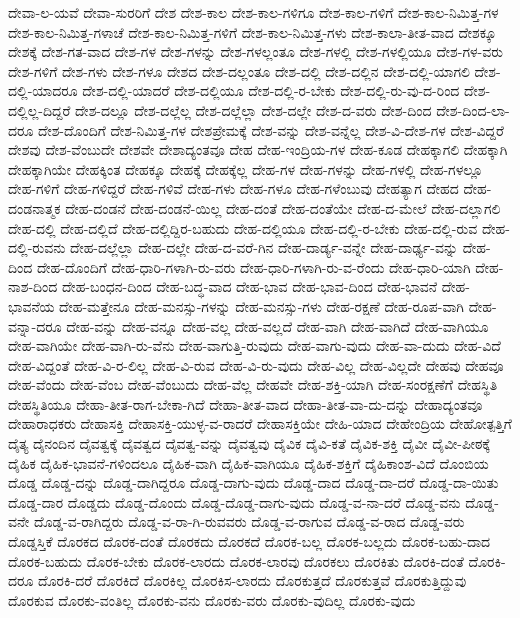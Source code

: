 {ದೇವಾ-ಲ-ಯವೆ
ದೇವಾ-ಸುರರಿಗೆ
ದೇಶ
ದೇಶ-ಕಾಲ
ದೇಶ-ಕಾಲ-ಗಳಿಗೂ
ದೇಶ-ಕಾಲ-ಗಳಿಗೆ
ದೇಶ-ಕಾಲ-ನಿಮಿತ್ತ-ಗಳ
ದೇಶ-ಕಾಲ-ನಿಮಿತ್ತ-ಗಳಾಚೆ
ದೇಶ-ಕಾಲ-ನಿಮಿತ್ತ-ಗಳಿಗೆ
ದೇಶ-ಕಾಲ-ನಿಮಿತ್ತ-ಗಳು
ದೇಶ-ಕಾಲಾ-ತೀತ-ವಾದ
ದೇಶಕ್ಕೂ
ದೇಶಕ್ಕೆ
ದೇಶ-ಗತ-ವಾದ
ದೇಶ-ಗಳ
ದೇಶ-ಗಳನ್ನು
ದೇಶ-ಗಳಲ್ಲಂತೂ
ದೇಶ-ಗಳಲ್ಲಿ
ದೇಶ-ಗಳಲ್ಲಿಯೂ
ದೇಶ-ಗಳ-ವರು
ದೇಶ-ಗಳಿಗೆ
ದೇಶ-ಗಳು
ದೇಶ-ಗಳೂ
ದೇಶದ
ದೇಶ-ದಲ್ಲಂತೂ
ದೇಶ-ದಲ್ಲಿ
ದೇಶ-ದಲ್ಲಿನ
ದೇಶ-ದಲ್ಲಿ-ಯಾಗಲಿ
ದೇಶ-ದಲ್ಲಿ-ಯಾದರೂ
ದೇಶ-ದಲ್ಲಿ-ಯಾದರೆ
ದೇಶ-ದಲ್ಲಿಯೂ
ದೇಶ-ದಲ್ಲಿ-ರ-ಬೇಕು
ದೇಶ-ದಲ್ಲಿ-ರು-ವು-ದ-ರಿಂದ
ದೇಶ-ದಲ್ಲಿಲ್ಲ-ದಿದ್ದರೆ
ದೇಶ-ದಲ್ಲೂ
ದೇಶ-ದಲ್ಲೆಲ್ಲ
ದೇಶ-ದಲ್ಲೆಲ್ಲಾ
ದೇಶ-ದಲ್ಲೇ
ದೇಶ-ದ-ವರು
ದೇಶ-ದಿಂದ
ದೇಶ-ದಿಂದ-ಲಾ-ದರೂ
ದೇಶ-ದೊಂದಿಗೆ
ದೇಶ-ನಿಮಿತ್ತ-ಗಳ
ದೇಶಪ್ರೇಮಕ್ಕೆ
ದೇಶ-ವನ್ನು
ದೇಶ-ವನ್ನೆಲ್ಲ
ದೇಶ-ವಿ-ದೇಶ-ಗಳ
ದೇಶ-ವಿದ್ದರೆ
ದೇಶವು
ದೇಶ-ವೆಂಬುದೇ
ದೇಶವೇ
ದೇಶಾದ್ಯಂತವೂ
ದೇಹ
ದೇಹ-ಇಂದ್ರಿಯ-ಗಳ
ದೇಹ-ಕೂಡ
ದೇಹಕ್ಕಾಗಲಿ
ದೇಹಕ್ಕಾಗಿ
ದೇಹಕ್ಕಾಗಿಯೇ
ದೇಹಕ್ಕಿಂತ
ದೇಹಕ್ಕೂ
ದೇಹಕ್ಕೆ
ದೇಹಕ್ಕೆಲ್ಲ
ದೇಹ-ಗಳ
ದೇಹ-ಗಳನ್ನು
ದೇಹ-ಗಳಲ್ಲಿ
ದೇಹ-ಗಳಲ್ಲೂ
ದೇಹ-ಗಳಿಗೆ
ದೇಹ-ಗಳಿದ್ದರೆ
ದೇಹ-ಗಳಿವೆ
ದೇಹ-ಗಳು
ದೇಹ-ಗಳೂ
ದೇಹ-ಗಳೆಂಬುವು
ದೇಹತ್ಯಾಗ
ದೇಹದ
ದೇಹ-ದಂಡನಾತ್ಮಕ
ದೇಹ-ದಂಡನೆ
ದೇಹ-ದಂಡನೆ-ಯಿಲ್ಲ
ದೇಹ-ದಂತೆ
ದೇಹ-ದಂತೆಯೇ
ದೇಹ-ದ-ಮೇಲೆ
ದೇಹ-ದಲ್ಲಾಗಲಿ
ದೇಹ-ದಲ್ಲಿ
ದೇಹ-ದಲ್ಲಿದೆ
ದೇಹ-ದಲ್ಲಿದ್ದಿರ-ಬಹುದು
ದೇಹ-ದಲ್ಲಿಯೂ
ದೇಹ-ದಲ್ಲಿ-ರ-ಬೇಕು
ದೇಹ-ದಲ್ಲಿ-ರುವ
ದೇಹ-ದಲ್ಲಿ-ರುವನು
ದೇಹ-ದಲ್ಲೆಲ್ಲಾ
ದೇಹ-ದಲ್ಲೇ
ದೇಹ-ದ-ವರೆ-ಗಿನ
ದೇಹ-ದಾರ್ಡ್ಯ-ವನ್ನೇ
ದೇಹ-ದಾರ್ಢ್ಯ-ವನ್ನು
ದೇಹ-ದಿಂದ
ದೇಹ-ದೊಂದಿಗೆ
ದೇಹ-ಧಾರಿ-ಗಳಾಗಿ-ರು-ವರು
ದೇಹ-ಧಾರಿ-ಗಳಾಗಿ-ರು-ವ-ರೆಂದು
ದೇಹ-ಧಾರಿ-ಯಾಗಿ
ದೇಹ-ನಾಶ-ದಿಂದ
ದೇಹ-ಬಂಧನ-ದಿಂದ
ದೇಹ-ಬದ್ಧ-ವಾದ
ದೇಹ-ಭಾವ
ದೇಹ-ಭಾವ-ದಿಂದ
ದೇಹ-ಭಾವನೆ
ದೇಹ-ಭಾವನೆಯ
ದೇಹ-ಮತ್ತೇನೂ
ದೇಹ-ಮನಸ್ಸು-ಗಳನ್ನು
ದೇಹ-ಮನಸ್ಸು-ಗಳು
ದೇಹ-ರಕ್ಷಣೆ
ದೇಹ-ರೂಪ-ವಾಗಿ
ದೇಹ-ವನ್ನಾ-ದರೂ
ದೇಹ-ವನ್ನು
ದೇಹ-ವನ್ನೂ
ದೇಹ-ವಲ್ಲ
ದೇಹ-ವಲ್ಲದೆ
ದೇಹ-ವಾಗಿ
ದೇಹ-ವಾಗಿದೆ
ದೇಹ-ವಾಗಿಯೂ
ದೇಹ-ವಾಗಿಯೇ
ದೇಹ-ವಾಗಿ-ರು-ವೆನು
ದೇಹ-ವಾಗುತ್ತಿ-ರುವುದು
ದೇಹ-ವಾಗು-ವುದು
ದೇಹ-ವಾ-ದುದು
ದೇಹ-ವಿದೆ
ದೇಹ-ವಿದ್ದಂತೆ
ದೇಹ-ವಿ-ರ-ಲಿಲ್ಲ
ದೇಹ-ವಿ-ರುವ
ದೇಹ-ವಿ-ರು-ವುದು
ದೇಹ-ವಿಲ್ಲ
ದೇಹ-ವಿಲ್ಲದೇ
ದೇಹವು
ದೇಹವೂ
ದೇಹ-ವೆಂದು
ದೇಹ-ವೆಂಬ
ದೇಹ-ವೆಂಬುದು
ದೇಹ-ವೆಲ್ಲ
ದೇಹವೇ
ದೇಹ-ಶಕ್ತಿ-ಯಾಗಿ
ದೇಹ-ಸಂರಕ್ಷಣೆಗೆ
ದೇಹಸ್ಥಿತಿ
ದೇಹಸ್ಥಿತಿಯೂ
ದೇಹಾ-ತೀತ-ರಾಗ-ಬೇಕಾ-ಗಿದೆ
ದೇಹಾ-ತೀತ-ವಾದ
ದೇಹಾ-ತೀತ-ವಾ-ದು-ದನ್ನು
ದೇಹಾದ್ಯಂತವೂ
ದೇಹಾರಾಧಕರು
ದೇಹಾಸಕ್ತಿ
ದೇಹಾಸಕ್ತಿ-ಯುಳ್ಳ-ವ-ರಾದರೆ
ದೇಹಾಸಕ್ತಿಯೇ
ದೇಹಿ-ಯಾದ
ದೇಹೇಂದ್ರಿಯ
ದೇಹೋತ್ಪತ್ತಿಗೆ
ದೈತ್ಯ
ದೈನಂದಿನ
ದೈವತ್ವಕ್ಕೆ
ದೈವತ್ವದ
ದೈವತ್ವ-ವನ್ನು
ದೈವತ್ವವು
ದೈವಿಕ
ದೈವಿ-ಕತೆ
ದೈವಿಕ-ಶಕ್ತಿ
ದೈವೀ
ದೈವೀ-ಪೀಠಕ್ಕೆ
ದೈಹಿಕ
ದೈಹಿಕ-ಭಾವನೆ-ಗಳಿಂದಲೂ
ದೈಹಿಕ-ವಾಗಿ
ದೈಹಿಕ-ವಾಗಿಯೂ
ದೈಹಿಕ-ಶಕ್ತಿಗೆ
ದೈಹಿಕಾಂಶ-ವಿದೆ
ದೊಂಬಿಯ
ದೊಡ್ಡ
ದೊಡ್ಡ-ದನ್ನು
ದೊಡ್ಡ-ದಾಗಿದ್ದರೂ
ದೊಡ್ಡ-ದಾಗು-ವುದು
ದೊಡ್ಡ-ದಾದ
ದೊಡ್ಡ-ದಾ-ದರೆ
ದೊಡ್ಡ-ದಾ-ಯಿತು
ದೊಡ್ಡ-ದಾರ
ದೊಡ್ಡದು
ದೊಡ್ಡ-ದೊಂದು
ದೊಡ್ಡ-ದೊಡ್ಡ-ದಾಗು-ವುದು
ದೊಡ್ಡ-ವ-ನಾ-ದರೆ
ದೊಡ್ಡ-ವನು
ದೊಡ್ಡ-ವನೇ
ದೊಡ್ಡ-ವ-ರಾಗಿದ್ದರು
ದೊಡ್ಡ-ವ-ರಾ-ಗಿ-ರುವವರು
ದೊಡ್ಡ-ವ-ರಾಗುವ
ದೊಡ್ಡ-ವ-ರಾದ
ದೊಡ್ಡ-ವರು
ದೊಡ್ಡಸ್ತಿಕೆ
ದೊರಕದ
ದೊರಕ-ದಂತೆ
ದೊರಕದು
ದೊರಕದೆ
ದೊರಕ-ಬಲ್ಲ
ದೊರಕ-ಬಲ್ಲದು
ದೊರಕ-ಬಹು-ದಾದ
ದೊರಕ-ಬಹುದು
ದೊರಕ-ಬೇಕು
ದೊರಕ-ಲಾರದು
ದೊರಕ-ಲಾರವು
ದೊರಕಲು
ದೊರಕಿತು
ದೊರಕಿ-ದಂತೆ
ದೊರಕಿ-ದರೂ
ದೊರಕಿ-ದರೆ
ದೊರಕಿದೆ
ದೊರಕಿಲ್ಲ
ದೊರಕಿಸ-ಲಾರದು
ದೊರಕುತ್ತದೆ
ದೊರಕುತ್ತವೆ
ದೊರಕುತ್ತಿದ್ದುವು
ದೊರಕುವ
ದೊರಕು-ವಂತಿಲ್ಲ
ದೊರಕು-ವನು
ದೊರಕು-ವರು
ದೊರಕು-ವುದಿಲ್ಲ
ದೊರಕು-ವುದು
}
